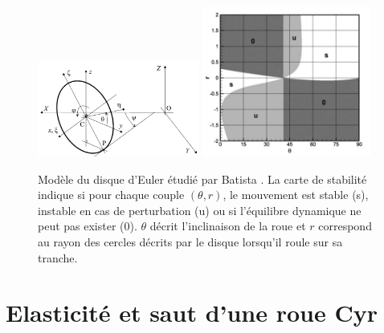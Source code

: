 \begin{figure}[h]
\centering
\includegraphics[width=200]{batista/ref1.png}
\includegraphics[width=210]{images_autres/cartebat.png}
\caption{Modèle du disque d'Euler étudié par Batista \cite{Batista}. La carte de stabilité indique si pour chaque couple $(\theta, r)$, le mouvement est stable (s), instable en cas de perturbation (u) ou si l'équilibre dynamique ne peut pas exister (0). $\theta$ décrit l'inclinaison de la roue et $r$ correspond au rayon des cercles décrits par le disque lorsqu'il roule sur sa tranche.}
\label{fig:figures}
\end{figure}

\section{Elasticité et saut d'une roue Cyr}
